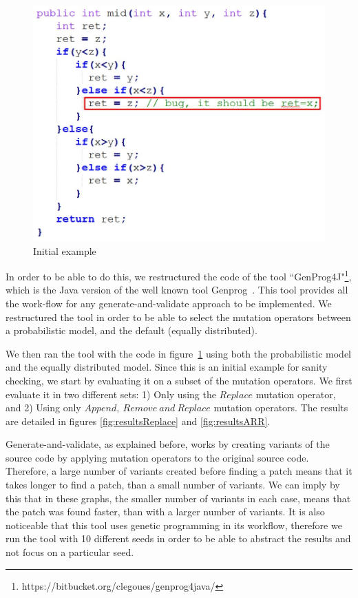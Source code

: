 \documentclass[conference]{IEEEtran}
\begin{document}
\begin{figure}[!h]
  \centering
    \includegraphics[scale=0.35]{sanity2}
  \caption{Initial example}
  \label{fig:initialExample}
\end{figure}

In order to be able to do this, we restructured the code of the tool ``GenProg4J"\footnote{https://bitbucket.org/clegoues/genprog4java/}, which is the Java version of the 
well known tool Genprog~\cite{legoues12}. This tool provides all the work-flow 
for any generate-and-validate approach to be implemented. We restructured the 
tool in order to be able to select the mutation operators between a 
probabilistic model, and the default (equally distributed).

We then ran the tool with the code in figure~\ref{fig:initialExample} using both 
the probabilistic model and the equally distributed model. Since this is an 
initial example for sanity checking, we start by evaluating it on a subset of 
the mutation operators. We first evaluate it in two different sets: 1) Only using the $Replace$ mutation operator, and 2) Using only $Append,~
Remove~and~Replace$ mutation operators. The results are detailed in figures 
\ref{fig:resultsReplace} and \ref{fig:resultsARR}. 

Generate-and-validate, as explained before, works by creating variants of the 
source code by applying mutation operators to the original source code. 
Therefore, a large number of variants created before finding a patch means that 
it takes longer to find a patch, than a small number of variants. We can imply by this 
that in these graphs, the smaller number of variants in each case, means that 
the patch was found faster, than with a larger number of variants. It is also 
noticeable that this tool uses genetic programming in its workflow, therefore we 
run the tool with 10 different seeds in order to be able to abstract the results 
and not focus on a particular seed.
\end{document}
